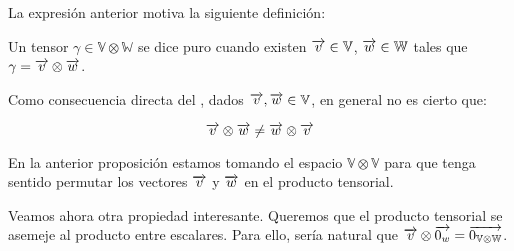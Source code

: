 La expresión anterior motiva la siguiente definición:

\begin{definicion} \label{def:tensor_puro}
    Un tensor $\gamma \in \mathbb{V} \otimes \mathbb{W}$ se dice puro cuando existen $\overrightarrow{v} \in \mathbb{V}$, $\overrightarrow{w} \in \mathbb{W}$ tales que $\gamma = \overrightarrow{v} \otimes \overrightarrow{w}$.
\end{definicion}

\begin{proposicion}
    Como consecuencia directa del , dados $\overrightarrow{v}, \overrightarrow{w} \in \mathbb{V}$, en general no es cierto que:

    \begin{equation}
        \overrightarrow{v} \otimes \overrightarrow{w} \neq \overrightarrow{w} \otimes \overrightarrow{v}
    \end{equation}

    \begin{observacion}
        En la anterior proposición estamos tomando el espacio $\mathbb{V} \otimes \mathbb{V}$ para que tenga sentido permutar los vectores $\overrightarrow{v}$ y $\overrightarrow{w}$ en el producto tensorial.
    \end{observacion}
\end{proposicion}

Veamos ahora otra propiedad interesante. Queremos que el producto tensorial se asemeje al producto entre escalares. Para ello, sería natural que $\overrightarrow{v} \otimes \overrightarrow{0_w} = \overrightarrow{0_{\mathbb{V} \otimes \mathbb{W}}}$.

